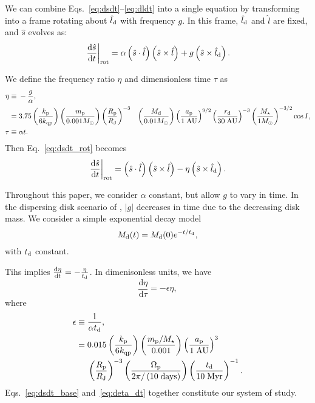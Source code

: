 \documentclass[
        fleqn,
        usenatbib,
        referee,
    ]{mnras}
\newcommand*{\rd}[2]{\frac{\mathrm{d}#1}{\mathrm{d}#2}}
\newcommand*{\at}[1]{\left.#1\right|}
\newcommand*{\abs}[1]{\left|#1\right|}
\newcommand*{\p}[1]{\left(#1\right)}
\begin{document}
We can combine Eqs.~\eqref{eq:dsdt}--\eqref{eq:dldt} into a single equation by
transforming into a frame rotating about $\hat{l}_{\rm d}$ with frequency $g$.
In this frame, $\hat{l}_{\rm d}$ and $\hat{l}$ are fixed, and $\hat{s}$ evolves
as:
\begin{equation}
    \at{\rd{\hat{s}}{t}}_{\rm rot} = \alpha \p{\hat{s} \cdot \hat{l}}
            \p{\hat{s} \times \hat{l}}
        + g\p{\hat{s} \times \hat{l}_{\rm d}}.\label{eq:dsdt_rot}
\end{equation}

We define the frequency ratio $\eta$ and dimensionless time $\tau$ as
\begin{align}
    \eta \equiv{}& -\frac{g}{\alpha}\label{eq:eta},\\
        ={}& 3.75 \p{\frac{k_{\rm p}}{6k_{\rm qp}}}
            \p{\frac{m_{\rm p}}{0.001 M_\odot}}
            \p{\frac{R_{\rm p}}{R_{\rm J}}}^{-3}
        &\p{\frac{M_{\rm d}}{0.01 M_{\odot}}}
            \p{\frac{a_{\rm p}}{1\;\mathrm{AU}}}^{9/2}
            \p{\frac{r_{\rm d}}{30 \;\mathrm{AU}}}^{-3}
            \p{\frac{M_\star}{1M_{\odot}}}^{-3/2}
            \cos I,\\
    \tau \equiv{}& \alpha t.
\end{align}
Then Eq.~\eqref{eq:dsdt_rot} becomes
\begin{equation}
    \at{\rd{\hat{s}}{t}}_{\rm rot} = \p{\hat{s} \cdot \hat{l}}
            \p{\hat{s} \times \hat{l}}
        - \eta\p{\hat{s} \times \hat{l}_{\rm d}}. \label{eq:dsdt_base}
\end{equation}

Throughout this paper, we consider $\alpha$ constant, but allow $g$ to vary in
time. In the dispersing disk scenario of \citet{millholland_disk}, $\abs{g}$
decreases in time due to the decreasing disk mass. We consider a simple
exponential decay model
\begin{equation}
    M_{\rm d}(t) = M_{\rm d}(0)e^{-t/t_{\rm d}},\label{eq:dmd_dt}
\end{equation}
with $t_{\rm d}$ constant.

Tihs implies $\rd{\eta}{t} = -\frac{\eta}{t_{\rm d}}$. In dimenisonless units,
we have
\begin{equation}
    \rd{\eta}{\tau} = -\epsilon \eta\label{eq:deta_dt},
\end{equation}
where
\begin{align}
    \epsilon \equiv{}& \frac{1}{\alpha t_{\rm d}},\label{eq:eps_def}\\
        ={}& 0.015 \p{\frac{k_{\rm p}}{6k_{\rm qp}}}
            \p{\frac{m_{\rm p}/M_\star}{0.001}}
            \p{\frac{a_{\rm p}}{1\;\mathrm{AU}}}^3\nonumber\\
        &\p{\frac{R_{\rm p}}{R_{\rm J}}}^{-3}
            \p{\frac{\Omega_{\rm p}}{2\pi/\p{10\;\mathrm{days}}}}
            \p{\frac{t_{\rm d}}{10\;\mathrm{Myr}}}^{-1}.
\end{align}
Eqs.~\eqref{eq:dsdt_base} and~\eqref{eq:deta_dt} together constitute our system
of study.
\end{document}
